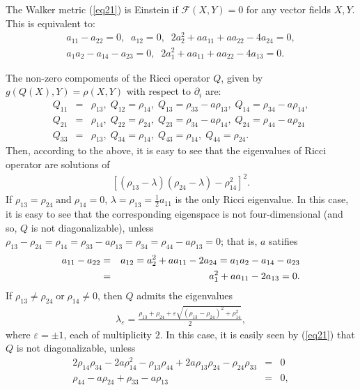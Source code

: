 \documentclass[reqno, 12pt]{amsart}
\numberwithin{equation}{section}
\begin{document}
The Walker metric (\ref{eq21}) is Einstein if $\mathcal{F}(X,Y)= 0$ for 
any vector fields $X,Y$. This is equivalent to:
\begin{eqnarray*} 
a_{11} -  a_{22} = 0,\; \; a_{12} = 0, \; \;
2a^{2}_{2} + aa_{11} + aa_{22} - 4a_{24}  = 0, \\
a_1a_2 - a_{14} - a_{23} = 0,\; \;
2a^{2}_{1} + aa_{11} + aa_{22} - 4a_{13}  =  0.
\end{eqnarray*}

\noindent
The non-zero compoments of the Ricci operator $Q$, given by $g(Q(X),Y)=\rho(X,Y)$ with respect to $\partial_i$ are: 
 \begin{eqnarray}\label{eq25}
Q_{11} &=& \rho_{13}, \; Q_{12} = \rho_{14},\; 
Q_{13} = \rho_{33} - a\rho_{13},\; Q_{14} = \rho_{34} - a\rho_{14},
\nonumber \\
Q_{21} & = & \rho_{14}, \; Q_{22} = \rho_{24}, \; 
Q_{23} = \rho_{34} - a\rho_{14}, \; Q_{24} = \rho_{44} - a\rho_{24}\nonumber \\
Q_{33} &=& \rho_{13}, \; Q_{34} = \rho_{14}, \; Q_{43} = \rho_{14}, \;
Q_{44} = \rho_{24}.
 \end{eqnarray}
Then, according to the above, it is easy to see that the eigenvalues of Ricci operator are solutions of
\begin{eqnarray*}
\left[\left(\rho_{13}-\lambda\right)\left(\rho_{24}-\lambda\right)-\rho^{2}_{14}\right]^2.
\end{eqnarray*}
If $\rho_{13}=\rho_{24}\;\mbox{and}\;\rho_{14}=0$, $\lambda=\rho_{13}=\frac{1}{2}a_{11}$ is the only Ricci eigenvalue. In this case, it is easy 
to see that the corresponding eigenspace is not four-dimensional (and 
so, $Q$ is not diagonalizable), unless $\rho_{13}-\rho_{24}=\rho_{14}=\rho_{33}-a\rho_{13}=\rho_{34}=\rho_{44}-a\rho_{13}=0$; that is,  
$a$ satifies
\begin{eqnarray}\label{eq26}
a_{11}-a_{22}&=& a_{12} = a^{2}_{2} + aa_{11} - 2a_{24} 
= a_{1}a_{2} - a_{14} - a_{23}
\cr&=&a^{2}_{1}+aa_{11}-2a_{13}=0.
\end{eqnarray}
If $\rho_{13}\neq\rho_{24}\;\mbox{or}\;\rho_{14}\neq0$, then $Q$ admits the eigenvalues
\begin{eqnarray*}\label{eq27}
\lambda_{\varepsilon}= \frac{\rho_{13}+\rho_{24}+ \varepsilon\sqrt{(\rho_{13}-\rho_{24})^{2}+\rho_{14}^2}}{2},
\end{eqnarray*}
where $\varepsilon=\pm 1$, each of multiplicity $2$. In this case, it is
easily seen by (\ref{eq21}) that $Q$ is not diagonalizable, unless
\begin{eqnarray}
 2\rho_{14}\rho_{34}-2a\rho_{14}^2- \rho_{13}\rho_{44}
 +  2a\rho_{13}\rho_{24}- \rho_{24}\rho_{33} &=& 0  \nonumber\\
 \rho_{44}-a\rho_{24} +  \rho_{33} - a \rho_{13} &=& 0, 
\end{eqnarray}
\end{document}
